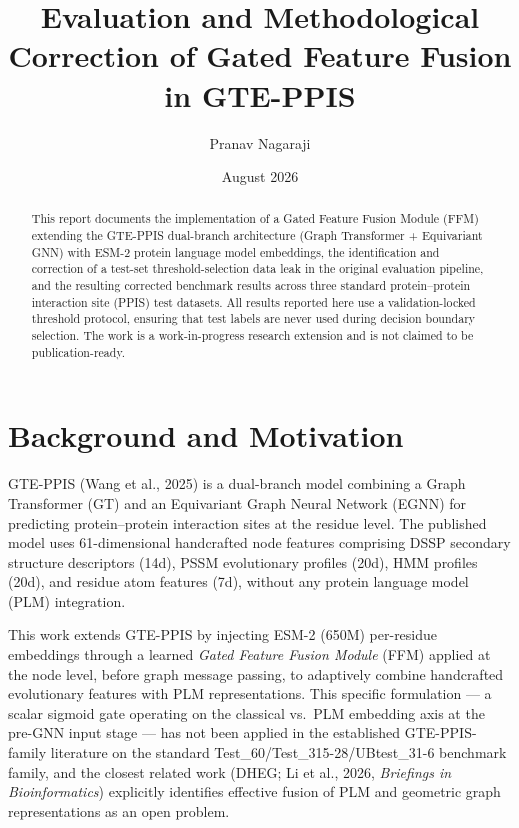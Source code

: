 \documentclass[11pt,a4paper]{article}
\title{\textbf{Evaluation and Methodological Correction of Gated Feature Fusion in GTE-PPIS}}
\author{Pranav Nagaraji}
\date{August 2026}
\begin{document}
\maketitle

\begin{abstract}
This report documents the implementation of a Gated Feature Fusion Module (FFM) extending
the GTE-PPIS dual-branch architecture (Graph Transformer + Equivariant GNN) with
ESM-2 protein language model embeddings, the identification and correction of a
test-set threshold-selection data leak in the original evaluation pipeline, and the
resulting corrected benchmark results across three standard protein--protein interaction
site (PPIS) test datasets. All results reported here use a validation-locked threshold
protocol, ensuring that test labels are never used during decision boundary selection.
The work is a work-in-progress research extension and is not claimed to be
publication-ready.
\end{abstract}

\tableofcontents
\vspace{1em}

\section{Background and Motivation}

GTE-PPIS (Wang et al., 2025) is a dual-branch model combining a Graph Transformer
(GT) and an Equivariant Graph Neural Network (EGNN) for predicting protein--protein
interaction sites at the residue level. The published model uses 61-dimensional
handcrafted node features comprising DSSP secondary structure descriptors (14d),
PSSM evolutionary profiles (20d), HMM profiles (20d), and residue atom features (7d),
without any protein language model (PLM) integration.

This work extends GTE-PPIS by injecting ESM-2 (650M) per-residue embeddings through
a learned \emph{Gated Feature Fusion Module} (FFM) applied at the node level,
before graph message passing, to adaptively combine handcrafted evolutionary features
with PLM representations. This specific formulation --- a scalar sigmoid gate operating
on the classical vs.\ PLM embedding axis at the pre-GNN input stage --- has not
been applied in the established GTE-PPIS-family literature on the standard
Test\_60/Test\_315-28/UBtest\_31-6 benchmark family, and the closest related work
(DHEG; Li et al., 2026, \textit{Briefings in Bioinformatics}) explicitly identifies
effective fusion of PLM and geometric graph representations as an open problem.
\end{document}
